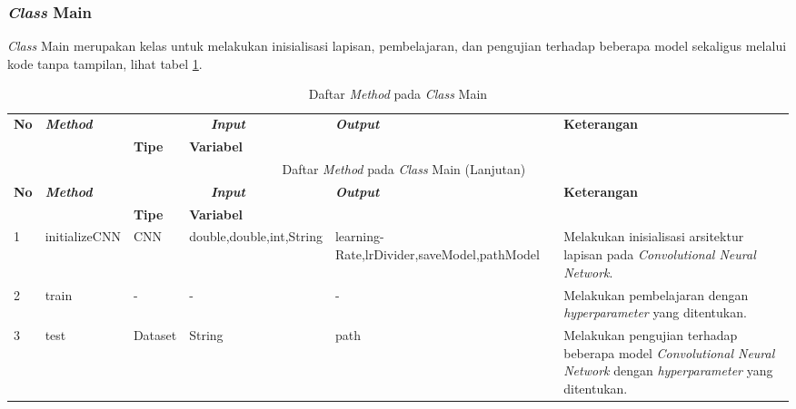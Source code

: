 \subsubsection{\textit{Class} Main}
\noindent \textit{Class} Main merupakan kelas untuk melakukan inisialisasi lapisan, pembelajaran, dan pengujian terhadap beberapa model sekaligus melalui kode tanpa tampilan, lihat tabel \ref{tbl:classMain}.
\begingroup
\setlength{\LTleft}{-20cm plus -1fill}
\setlength{\LTright}{\LTleft}
\begin{small}
\begin{longtable}{|p{0.4cm}|p{2cm}|p{1.8cm}|p{1.8cm}|p{1.7cm}|p{3.55cm}|}
	\caption{Daftar \textit{Method} pada \textit{Class} Main \label{tbl:classMain}}\\
	\hline
	\multirow{2}{*}{\textbf{No}} & \multirow{2}{*}{\textit{\textbf{Method}}} & \multicolumn{2}{c|}{\textit{\textbf{Input}}} & \multirow{2}{*}{\textit{\textbf{Output}}} & 
	\multirow{2}{*}{\textbf{Keterangan}}\\
	\cline{3-4}
	& & \textbf{Tipe} & \textbf{Variabel} & & \\
	\endfirsthead
	\multicolumn{6}{c}{\textbf{\tablename~\thetable} Daftar \textit{Method} pada \textit{Class} Main (Lanjutan)} \\
	\hline
	\multirow{2}{*}{\textbf{No}} & \multirow{2}{*}{\textit{\textbf{Method}}} & \multicolumn{2}{c|}{\textit{\textbf{Input}}} & \multirow{2}{*}{\textit{\textbf{Output}}} & 
	\multirow{2}{*}{\textbf{Keterangan}}\\
	\cline{3-4}
	& & \textbf{Tipe} & \textbf{Variabel} & & \\
	\endhead
	\hline
	1 & initializeCNN & CNN & double,\newline double,\newline int,\newline String & learning-\newline Rate,\newline lrDivider,\newline saveModel,\newline pathModel & Melakukan inisialisasi arsitektur lapisan pada \textit{Convolutional Neural Network}.\\
	\hline
	2 & train & - & - & - & Melakukan pembelajaran dengan \textit{hyperparameter} yang ditentukan.\\
	\hline
	3 & test & Dataset & String & path & Melakukan pengujian terhadap beberapa model \textit{Convolutional Neural Network} dengan \textit{hyperparameter} yang ditentukan.\\
	\hline
\end{longtable}
\end{small}
\endgroup

